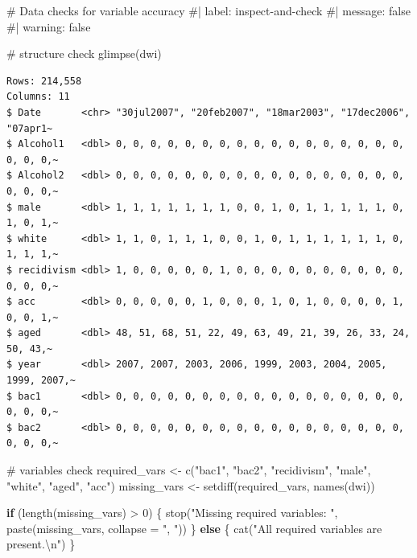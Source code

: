 \documentclass[
  letterpaper,
  DIV=11,
  numbers=noendperiod]{scrartcl}
\newenvironment{Shaded}{\begin{snugshade}}{\end{snugshade}}
\newcommand{\AttributeTok}[1]{\textcolor[rgb]{0.40,0.45,0.13}{#1}}
\newcommand{\CommentTok}[1]{\textcolor[rgb]{0.37,0.37,0.37}{#1}}
\newcommand{\ControlFlowTok}[1]{\textcolor[rgb]{0.00,0.23,0.31}{\textbf{#1}}}
\newcommand{\DecValTok}[1]{\textcolor[rgb]{0.68,0.00,0.00}{#1}}
\newcommand{\FunctionTok}[1]{\textcolor[rgb]{0.28,0.35,0.67}{#1}}
\newcommand{\NormalTok}[1]{\textcolor[rgb]{0.00,0.23,0.31}{#1}}
\newcommand{\OtherTok}[1]{\textcolor[rgb]{0.00,0.23,0.31}{#1}}
\newcommand{\SpecialCharTok}[1]{\textcolor[rgb]{0.37,0.37,0.37}{#1}}
\newcommand{\StringTok}[1]{\textcolor[rgb]{0.13,0.47,0.30}{#1}}
\begin{document}
\begin{Shaded}
\begin{Highlighting}[]
\CommentTok{\# Data checks for variable accuracy}
\CommentTok{\#| label: inspect{-}and{-}check}
\CommentTok{\#| message: false}
\CommentTok{\#| warning: false}

\CommentTok{\# structure check}
\FunctionTok{glimpse}\NormalTok{(dwi)}
\end{Highlighting}
\end{Shaded}

\begin{verbatim}
Rows: 214,558
Columns: 11
$ Date       <chr> "30jul2007", "20feb2007", "18mar2003", "17dec2006", "07apr1~
$ Alcohol1   <dbl> 0, 0, 0, 0, 0, 0, 0, 0, 0, 0, 0, 0, 0, 0, 0, 0, 0, 0, 0, 0,~
$ Alcohol2   <dbl> 0, 0, 0, 0, 0, 0, 0, 0, 0, 0, 0, 0, 0, 0, 0, 0, 0, 0, 0, 0,~
$ male       <dbl> 1, 1, 1, 1, 1, 1, 1, 0, 0, 1, 0, 1, 1, 1, 1, 1, 0, 1, 0, 1,~
$ white      <dbl> 1, 1, 0, 1, 1, 1, 0, 0, 1, 0, 1, 1, 1, 1, 1, 1, 0, 1, 1, 1,~
$ recidivism <dbl> 1, 0, 0, 0, 0, 0, 1, 0, 0, 0, 0, 0, 0, 0, 0, 0, 0, 0, 0, 0,~
$ acc        <dbl> 0, 0, 0, 0, 0, 1, 0, 0, 0, 1, 0, 1, 0, 0, 0, 0, 1, 0, 0, 1,~
$ aged       <dbl> 48, 51, 68, 51, 22, 49, 63, 49, 21, 39, 26, 33, 24, 50, 43,~
$ year       <dbl> 2007, 2007, 2003, 2006, 1999, 2003, 2004, 2005, 1999, 2007,~
$ bac1       <dbl> 0, 0, 0, 0, 0, 0, 0, 0, 0, 0, 0, 0, 0, 0, 0, 0, 0, 0, 0, 0,~
$ bac2       <dbl> 0, 0, 0, 0, 0, 0, 0, 0, 0, 0, 0, 0, 0, 0, 0, 0, 0, 0, 0, 0,~
\end{verbatim}

\begin{Shaded}
\begin{Highlighting}[]
\CommentTok{\# variables check}
\NormalTok{required\_vars }\OtherTok{\textless{}{-}} \FunctionTok{c}\NormalTok{(}\StringTok{"bac1"}\NormalTok{, }\StringTok{"bac2"}\NormalTok{, }\StringTok{"recidivism"}\NormalTok{, }\StringTok{"male"}\NormalTok{, }\StringTok{"white"}\NormalTok{, }\StringTok{"aged"}\NormalTok{, }\StringTok{"acc"}\NormalTok{)}
\NormalTok{missing\_vars }\OtherTok{\textless{}{-}} \FunctionTok{setdiff}\NormalTok{(required\_vars, }\FunctionTok{names}\NormalTok{(dwi))}

\ControlFlowTok{if}\NormalTok{ (}\FunctionTok{length}\NormalTok{(missing\_vars) }\SpecialCharTok{\textgreater{}} \DecValTok{0}\NormalTok{) \{}
  \FunctionTok{stop}\NormalTok{(}\StringTok{"Missing required variables: "}\NormalTok{, }\FunctionTok{paste}\NormalTok{(missing\_vars, }\AttributeTok{collapse =} \StringTok{", "}\NormalTok{))}
\NormalTok{\} }\ControlFlowTok{else}\NormalTok{ \{}
  \FunctionTok{cat}\NormalTok{(}\StringTok{"All required variables are present.}\SpecialCharTok{\textbackslash{}n}\StringTok{"}\NormalTok{)}
\NormalTok{\}}
\end{Highlighting}
\end{Shaded}
\end{document}
